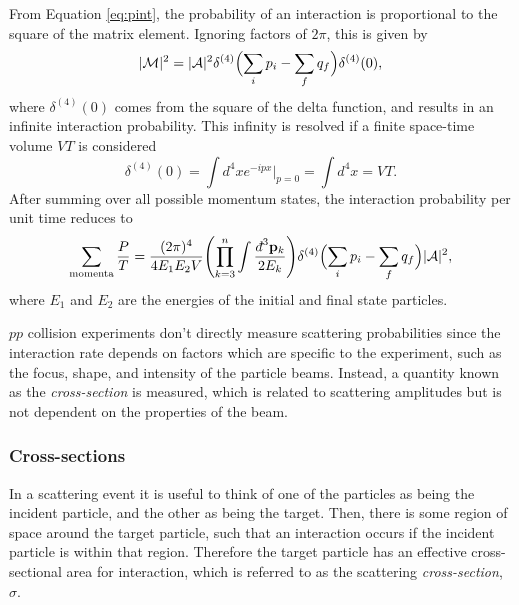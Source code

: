 From Equation \ref{eq:pint}, the probability of an interaction is proportional to the square of the matrix element. Ignoring factors of $2\pi$, this is given by 
\begin{equation}
    |\mathcal{M}|^2=|\mathcal{A}|^2\delta^{(4)}\Bigl(\sum_ip_i-\sum_fq_f\Bigr)\delta^{(4)}(0),
\end{equation}
where $\delta^{(4)}(0)$ comes from the square of the delta function, and results in an infinite interaction probability. This infinity is resolved if a finite space-time volume $VT$ is considered
\begin{equation}
    \delta^{(4)}(0)=\int d^4xe^{-ipx}\Bigr|_{p=0}=\int d^4x=VT.
\end{equation}
After summing over all possible momentum states, the interaction probability per unit time reduces to \cite{Buckley:PCP} 
\begin{equation}\label{eq:almostxs}
    \sum_{\text{momenta}}\frac{P}{T}=\frac{(2\pi)^4}{4E_1E_2V}\Biggl(\prod_{k=3}^{n}\int\frac{\dbar^3\mathbf{p}_k}{2E_k}\Biggr)\delta^{(4)}\Bigl(\sum_ip_i-\sum_fq_f\Bigr)|\mathcal{A}|^2,
\end{equation}
where $E_1$ and $E_2$ are the energies of the initial and final state particles.

$pp$ collision experiments don't directly measure scattering probabilities since the interaction rate depends on factors which are specific to the experiment, such as the focus, shape, and intensity of the particle beams. Instead, a quantity known as the \textit{cross-section} is measured, which is related to scattering amplitudes but is not dependent on the properties of the beam.

\subsubsection{Cross-sections}
In a scattering event it is useful to think of one of the particles as being the incident particle, and the other as being the target. Then, there is some region of space around the target particle, such that an interaction occurs if the incident particle is within that region. Therefore the target particle has an effective cross-sectional area for interaction, which is referred to as the scattering \textit{cross-section}, $\sigma$.


